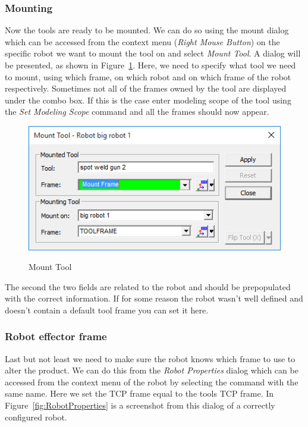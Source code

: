 \subsubsection{Mounting}
Now the tools are ready to be mounted.
We can do so using the mount dialog which can be accessed from the context menu (\emph{Right Mouse Button}) on the specific robot we want to mount the tool on and select \emph{Mount Tool}.
A dialog will be presented, as shown in Figure~\ref{fig:MountTool}.
Here, we need to specify what tool we need to mount, using which frame, on which robot and on which frame of the robot respectively.
Sometimes not all of the frames owned by the tool are displayed under the combo box. 
If this is the case enter modeling scope of the tool using the \emph{Set Modeling Scope} command and all the frames should now appear. \\

\begin{figure}[H]
    \caption{Mount Tool}
    \centering
    \includegraphics{mount_tool}
    \label{fig:MountTool}
\end{figure}

The second the two fields are related to the robot and should be prepopulated with the correct information.
If for some reason the robot wasn't well defined and doesn't contain a default tool frame you can set it here. \\

\subsubsection{Robot effector frame}
Last but not least we need to make sure the robot knows which frame to use to alter the product.
We can do this from the \emph{Robot Properties} dialog which can be accessed from the context menu of the robot by selecting the command with the same name. 
Here we set the TCP frame equal to the tools TCP frame.
In Figure~\ref{fig:RobotProperties} is a screenshot from this dialog of a correctly configured robot. \\

